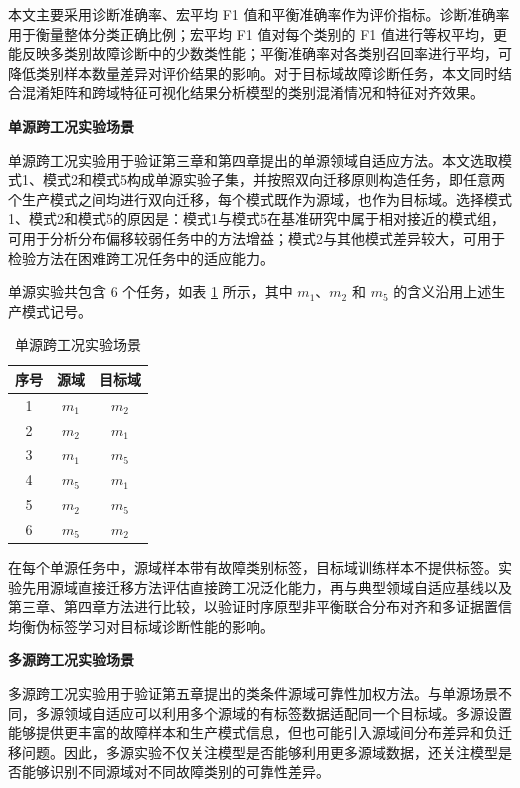 \documentclass{seuthesis-2022}
\begin{document}
本文主要采用诊断准确率、宏平均 F1 值和平衡准确率作为评价指标。诊断准确率用于衡量整体分类正确比例；宏平均 F1 值对每个类别的 F1 值进行等权平均，更能反映多类别故障诊断中的少数类性能；平衡准确率对各类别召回率进行平均，可降低类别样本数量差异对评价结果的影响。对于目标域故障诊断任务，本文同时结合混淆矩阵和跨域特征可视化结果分析模型的类别混淆情况和特征对齐效果。

\medskip
\noindent\textbf{单源跨工况实验场景}

单源跨工况实验用于验证第三章和第四章提出的单源领域自适应方法。本文选取模式1、模式2和模式5构成单源实验子集，并按照双向迁移原则构造任务，即任意两个生产模式之间均进行双向迁移，每个模式既作为源域，也作为目标域。选择模式1、模式2和模式5的原因是：模式1与模式5在基准研究中属于相对接近的模式组，可用于分析分布偏移较弱任务中的方法增益；模式2与其他模式差异较大，可用于检验方法在困难跨工况任务中的适应能力\cite{montesuma2024benchmark}。

单源实验共包含 6 个任务，如表 \ref{tab:single_source_tasks} 所示，其中 $m_1$、$m_2$ 和 $m_5$ 的含义沿用上述生产模式记号。

\begin{table}[!htbp]
    \centering
    \caption{单源跨工况实验场景}
    \label{tab:single_source_tasks}
    \begin{tabular}{c c c}
        \toprule
        序号 & 源域 & 目标域 \\
        \midrule
        1 & $m_1$ & $m_2$ \\
        2 & $m_2$ & $m_1$ \\
        3 & $m_1$ & $m_5$ \\
        4 & $m_5$ & $m_1$ \\
        5 & $m_2$ & $m_5$ \\
        6 & $m_5$ & $m_2$ \\
        \bottomrule
    \end{tabular}
\end{table}

在每个单源任务中，源域样本带有故障类别标签，目标域训练样本不提供标签。实验先用源域直接迁移方法评估直接跨工况泛化能力，再与典型领域自适应基线以及第三章、第四章方法进行比较，以验证时序原型非平衡联合分布对齐和多证据置信均衡伪标签学习对目标域诊断性能的影响。

\medskip
\noindent\textbf{多源跨工况实验场景}

多源跨工况实验用于验证第五章提出的类条件源域可靠性加权方法。与单源场景不同，多源领域自适应可以利用多个源域的有标签数据适配同一个目标域。多源设置能够提供更丰富的故障样本和生产模式信息，但也可能引入源域间分布差异和负迁移问题。因此，多源实验不仅关注模型是否能够利用更多源域数据，还关注模型是否能够识别不同源域对不同故障类别的可靠性差异。
\end{document}
